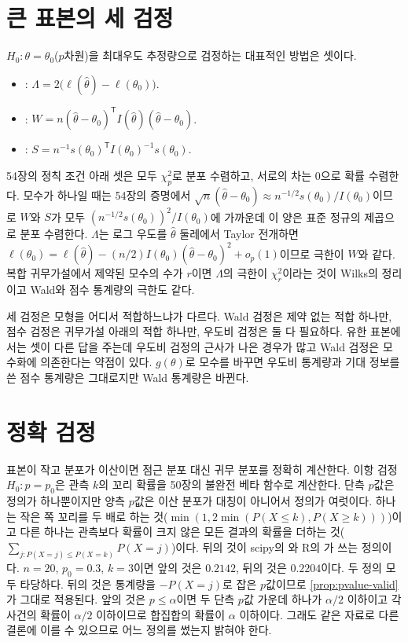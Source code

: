 \section{큰 표본의 세 검정}
\label{sec:three-tests}

$H_0:\theta=\theta_0$($p$차원)을 최대우도 추정량으로 검정하는 대표적인 방법은 셋이다.
\begin{itemize}
\item {}: $\Lambda=2\bigl(\ell(\hat\theta)-\ell(\theta_0)\bigr)$.
\item {}: $W=n(\hat\theta-\theta_0)^{\mathsf T}I(\hat\theta)(\hat\theta-\theta_0)$\cite{wald1943}.
\item {}: $S=n^{-1}s(\theta_0)^{\mathsf T}I(\theta_0)^{-1}s(\theta_0)$\cite{rao1948}.
\end{itemize}
54장의 정칙 조건 아래 셋은 모두 $\chi^2_p$로 분포 수렴하고, 서로의 차는 $0$으로 확률 수렴한다. 모수가 하나일 때는 54장의 증명에서 $\sqrt n(\hat\theta-\theta_0)\approx n^{-1/2}s(\theta_0)/I(\theta_0)$이므로 $W$와 $S$가 모두 $(n^{-1/2}s(\theta_0))^2/I(\theta_0)$에 가까운데 이 양은 표준 정규의 제곱으로 분포 수렴한다. $\Lambda$는 로그 우도를 $\hat\theta$ 둘레에서 Taylor 전개하면 $\ell(\theta_0)=\ell(\hat\theta)-(n/2)I(\theta_0)(\hat\theta-\theta_0)^2+o_p(1)$이므로 극한이 $W$와 같다. 복합 귀무가설에서 제약된 모수의 수가 $r$이면 $\Lambda$의 극한이 $\chi^2_r$이라는 것이 Wilks의 정리이고\cite{wilks1938} Wald와 점수 통계량의 극한도 같다.

세 검정은 모형을 어디서 적합하느냐가 다르다. Wald 검정은 제약 없는 적합 하나만, 점수 검정은 귀무가설 아래의 적합 하나만, 우도비 검정은 둘 다 필요하다. 유한 표본에서는 셋이 다른 답을 주는데 우도비 검정의 근사가 나은 경우가 많고 Wald 검정은 모수화에 의존한다는 약점이 있다. $g(\theta)$로 모수를 바꾸면 우도비 통계량과 기대 정보를 쓴 점수 통계량은 그대로지만 Wald 통계량은 바뀐다.

\section{정확 검정}
\label{sec:exact-tests}

표본이 작고 분포가 이산이면 점근 분포 대신 귀무 분포를 정확히 계산한다. 이항 검정 $H_0:p=p_0$은 관측 $k$의 꼬리 확률을 50장의 불완전 베타 함수로 계산한다. 단측 $p$값은 정의가 하나뿐이지만 양측 $p$값은 이산 분포가 대칭이 아니어서 정의가 여럿이다. 하나는 작은 쪽 꼬리를 두 배로 하는 것($\min(1,2\min(P(X\le k),P(X\ge k)))$)이고 다른 하나는 관측보다 확률이 크지 않은 모든 결과의 확률을 더하는 것($\sum_{j:P(X=j)\le P(X=k)}P(X=j)$)이다. 뒤의 것이 scipy의 와 R의 가 쓰는 정의이다. $n=20$, $p_0=0.3$, $k=3$이면 앞의 것은 $0.2142$, 뒤의 것은 $0.2204$이다. 두 정의 모두 타당하다. 뒤의 것은 통계량을 $-P(X=j)$로 잡은 $p$값이므로 \cref{prop:pvalue-valid}가 그대로 적용된다. 앞의 것은 $p\le\alpha$이면 두 단측 $p$값 가운데 하나가 $\alpha/2$ 이하이고 각 사건의 확률이 $\alpha/2$ 이하이므로 합집합의 확률이 $\alpha$ 이하이다. 그래도 같은 자료로 다른 결론에 이를 수 있으므로 어느 정의를 썼는지 밝혀야 한다.


